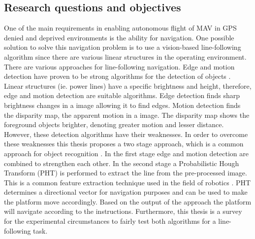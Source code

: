 \documentclass[a4paper]{article}
\begin{document}
\subsection{Research questions and objectives}
\label{researchquestion}
One of the main requirements in enabling autonomous flight of MAV in GPS denied and deprived environments is the ability for navigation. One possible solution to solve this navigation problem is to use a vision-based line-following algorithm since there are various linear structures in the operating environment. There are various approaches for line-following navigation. Edge and motion detection have proven to be strong algorithms for the detection of objects \cite{Bills2011, Gerke2011}. Linear structures (ie. power lines) have a specific brightness and height, therefore, edge and motion detection are suitable algorithms. Edge detection finds sharp brightness changes in a image allowing it to find edges. Motion detection finds the disparity map, the apparent motion in a image. The disparity map shows the foreground objects brighter, denoting greater motion and lesser distance. However, these detection algorithms have their weaknesses. In order to overcome these weaknesses this thesis proposes a two stage approach, which is a common approach for object recognition \cite{Frew2004, Katrasnik2010, Gerke2011}. In the first stage edge and motion detection are combined to strengthen each other. In the second stage a Probabilistic Hough Transform (PHT) is performed to extract the line from the pre-processed image. This is a common feature extraction technique used in the field of robotics \cite{Frew2004, Zhengrong2008, Bills2011}. PHT determines a directional vector for navigation purposes and can be used to make the platform move accordingly. Based on the output of the approach the platform will navigate according to the instructions. Furthermore, this thesis is a survey for the experimental circumstances to fairly test both algorithms for a line-following task.
\end{document}
